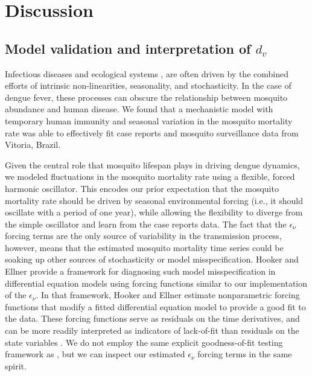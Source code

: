 \documentclass[10pt,letterpaper]{article}
\begin{document}
\section*{Discussion}

\subsection*{Model validation and interpretation of $d_v$}

Infectious diseases \cite{Ellner1998,Koelle2004} and ecological systems \cite{Bjornstad2001}, are often driven by the combined efforts of intrinsic non-linearities, seasonality, and stochasticity.
In the case of dengue fever, these processes can obscure the relationship between mosquito abundance and human disease.
We found that a mechanistic model with temporary human immunity and seasonal variation in the mosquito mortality rate was able to effectively fit case reports and mosquito surveillance data from Vitoria, Brazil.

Given the central role that mosquito lifespan plays in driving dengue dynamics, we modeled fluctuations in the mosquito mortality rate using a flexible, forced harmonic oscillator.
This encodes our prior expectation that the mosquito mortality rate should be driven by seasonal environmental forcing (i.e., it should oscillate with a period of one year), while allowing the flexibility to diverge from the simple oscillator and learn from the case reports data.
The fact that the $\epsilon_{\nu}$ forcing terms are the only source of variability in the transmission process, however, means that the estimated mosquito mortality time series could be soaking up other sources of stochasticity or model misspecification.
Hooker and Ellner \cite{Hooker2015} provide a framework for diagnosing such model misspecification in differential equation models using forcing functions similar to our implementation of the $\epsilon_{\nu}$.
In that framework, Hooker and Ellner \cite{Hooker2015} estimate nonparametric forcing functions that modify a fitted differential equation model to provide a good fit to the data.
These forcing functions serve as residuals on the time derivatives, and can be more readily interpreted as indicators of lack-of-fit than residuals on the state variables \cite{Hotelling1927, Hooker2015}.
We do not employ the same explicit goodness-of-fit testing framework as \cite{Hooker2015}, but we can inspect our estimated $\epsilon_{\nu}$ forcing terms in the same spirit.
\end{document}

